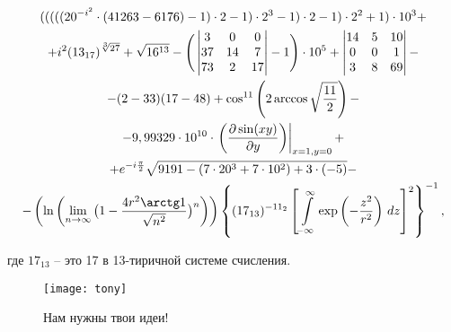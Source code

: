 \begin{gather*}
 (((((20^{-i^2}\cdot (41263-6176)-1)\cdot 2-1)\cdot 2^3 -1)\cdot 2-1)\cdot 2^2 +1)\cdot 10^3 +\\+ i^2(13_{17})^{\sqrt[3]{27}} +\sqrt{16^{13}} -\Bigg(
\begin{vmatrix}{}
3 & 0 & 0 \\
37 & 14 & 7 \\
73 & 2 & 17
\end{vmatrix}
 -1 \Bigg)\cdot 10^5 +
\begin{vmatrix}{}
14 & 5 & 10 \\
0 & 0 & 1 \\
3 & 8 & 69
\end{vmatrix}
 -\\- (2-33)(17-48) + \cos^{11}\left(2\arccos\sqrt{\frac{11}{2}}\right)  -\\- 9,99329\cdot 10^{10}\cdot \left.\bigg(\frac{\partial \sin(xy)}{\partial y}\bigg)\right|_{x=1,y=0} + \\ + e^{-i\frac{\pi}{2}}\sqrt{9191 -(7\cdot 20^3+7\cdot 10^2) + 3\cdot (-5)} - \\ -
\left(\ln\left(\lim\limits_{n \rightarrow \infty}\big(1-\frac{4r^2 \arctg 1}{\sqrt{n^2}} \big)^n\right)\right)\left\{(17_{13})^{-11_2}\left[\int\limits_{-\infty}^{\infty}\exp\left(-\frac{z^2}{r^2}\right)\,dz \right]^2\right\}^{-1},
\end{gather*}

где $17_{13}$ -- это 17 в 13-тиричной системе счисления.

\begin{figure}[ht!]
    \centering
    \texttt{[image: tony]}
    \caption{Нам нужны твои идеи!}
\end{figure}
